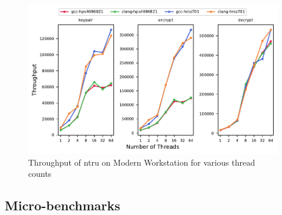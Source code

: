 \begin{figure}
    \centering
    \includegraphics[scale=0.75]{chapters/results/throughput/Modern Workstation_ntru.pdf}
    \caption{Throughput of \gls{ntru} on Modern Workstation for various thread counts}
    \label{figure:results:throughput:ntru-modern-workstation}
\end{figure}



\subsection{Micro-benchmarks}

